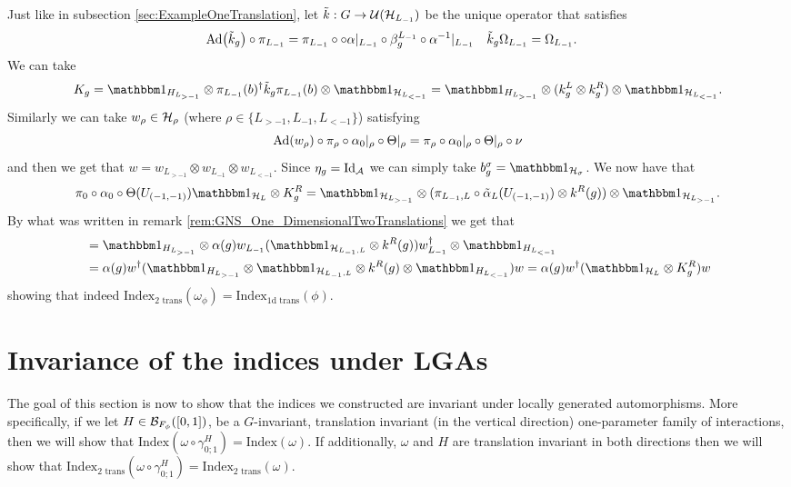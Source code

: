 \documentclass[11pt,a4paper,twoside]{article}
\numberwithin{equation}{section}
\begin{document}
	Just like in subsection \ref{sec:ExampleOneTranslation}, let $\tilde k:G\rightarrow \UU(\HH_{L_{-1}})$ be the unique operator that satisfies
	\begin{align}
		\Ad{\tilde{k}_g}\circ\pi_{L_{-1}}&=\pi_{L_{-1}}\circ \circ\alpha|_{L_{-1}}\circ\beta_g^{L_{-1}}\circ \alpha^{-1}|_{L_{-1}}&\tilde k_g\Omega_{L_{-1}}&=\Omega_{L_{-1}}.
	\end{align}
	We can take
	\begin{equation}
		K_g=\id_{H_{L_{>-1}}}\otimes \pi_{L_{-1}}(b)^\dagger \tilde k_g \pi_{L_{-1}}(b) \otimes\id_{\HH_{L_{<-1}}} =\id_{H_{L_{>-1}}}\otimes (k_g^L\otimes k_g^R) \otimes\id_{\HH_{L_{<-1}}}.
	\end{equation}
	Similarly we can take $w_\rho\in\HH_\rho$ (where $\rho\in\{L_{>-1},L_{-1},L_{<-1}\}$) satisfying
	\begin{equation}
		\Ad{w_\rho}\circ\pi_\rho\circ\alpha_{0}|_\rho\circ\Theta|_\rho=\pi_\rho\circ\alpha_{0}|_\rho\circ\Theta|_\rho\circ\nu
	\end{equation}
	and then we get that $w=w_{L_{>-1}}\otimes w_{L_{-1}}\otimes w_{L_{<-1}}$. Since $\eta_g=\textrm{Id}_{\AA}$ we can simply take $b_g^\sigma=\id_{\HH_\sigma}$. We now have that
	\begin{equation}
		\pi_0\circ\alpha_0\circ\Theta(U_{(-1,-1)})\id_{\HH_L}\otimes K_g^R=\id_{\HH_{L_{>-1}}}\otimes(\pi_{L_{-1},L}\circ\tilde\alpha_L(U_{(-1,-1)})\otimes k^R(g))\otimes\id_{\HH_{L_{>-1}}}.
	\end{equation}
	By what was written in remark \ref{rem:GNS_One_DimensionalTwoTranslations} we get that
	\begin{align}
		&=\id_{H_{L_{>-1}}}\otimes\alpha(g) w_{L_{-1}}(\id_{\HH_{L_{-1},L}}\otimes k^R(g))w_{L_{-1}}^\dagger\otimes \id_{H_{L_{<-1}}}\\
		\nonumber
		&=\alpha(g)w^\dagger (\id_{H_{L_{>-1}}}\otimes \id_{\HH_{L_{-1},L}}\otimes k^R(g)\otimes \id_{H_{L_{<-1}}}) w=\alpha(g)w^\dagger (\id_{\HH_L}\otimes K^R_g) w
	\end{align}
	showing that indeed $\textrm{Index}_{\text{2 trans}}(\omega_\phi)=\textrm{Index}_{\text{1d trans}}(\phi)$.
	\section{Invariance of the indices under LGAs}\label{sec:AllIndicesInvariantUnderLGA}
	The goal of this section is now to show that the indices we constructed are invariant under locally generated automorphisms. More specifically, if we let $H\in\BB_{F_\phi}([0,1])$, be a $G$-invariant, translation invariant (in the vertical direction) one-parameter family of interactions, then we will show that $\textrm{Index}(\omega\circ\gamma^H_{0;1})=\textrm{Index}(\omega)$. If additionally, $\omega$ and $H$ are translation invariant in both directions then we will show that $\textrm{Index}_{\text{2 trans}}(\omega\circ\gamma^H_{0;1})=\textrm{Index}_{\text{2 trans}}(\omega)$.
\end{document}
